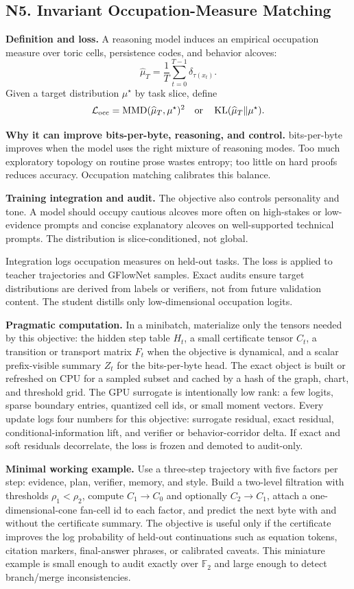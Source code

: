 \documentclass[10pt]{article}
\newcommand{\FF}{\mathbb{F}}
\newcommand{\KL}{\operatorname{KL}}
\newcommand{\loss}{\mathcal{L}}
\numberwithin{equation}{section}
\begin{document}
\subsection{N5. Invariant Occupation-Measure Matching}
\noindent\textbf{Definition and loss.} A reasoning model induces an empirical occupation measure over toric cells, persistence codes, and behavior alcoves:
\[
\widehat\mu_T=\frac1T\sum_{t=0}^{T-1}\delta_{\tau(x_t)}.
\]
Given a target distribution $\mu^\star$ by task slice, define
\[
\loss_{\rm occ}=\mathrm{MMD}(\widehat\mu_T,\mu^\star)^2\quad\text{or}\quad \KL(\widehat\mu_T\|\mu^\star).
\]

\noindent\textbf{Why it can improve bits-per-byte, reasoning, and control.} bits-per-byte improves when the model uses the right mixture of reasoning modes. Too much exploratory topology on routine prose wastes entropy; too little on hard proofs reduces accuracy. Occupation matching calibrates this balance.

\noindent\textbf{Training integration and audit.} The objective also controls personality and tone. A model should occupy cautious alcoves more often on high-stakes or low-evidence prompts and concise explanatory alcoves on well-supported technical prompts. The distribution is slice-conditioned, not global.

Integration logs occupation measures on held-out tasks. The loss is applied to teacher trajectories and GFlowNet samples. Exact audits ensure target distributions are derived from labels or verifiers, not from future validation content. The student distills only low-dimensional occupation logits.

\noindent\textbf{Pragmatic computation.} In a minibatch, materialize only the tensors needed by this objective: the hidden step table $H_t$, a small certificate tensor $C_t$, a transition or transport matrix $F_t$ when the objective is dynamical, and a scalar prefix-visible summary $Z_t$ for the bits-per-byte head. The exact object is built or refreshed on CPU for a sampled subset and cached by a hash of the graph, chart, and threshold grid. The GPU surrogate is intentionally low rank: a few logits, sparse boundary entries, quantized cell ids, or small moment vectors. Every update logs four numbers for this objective: surrogate residual, exact residual, conditional-information lift, and verifier or behavior-corridor delta. If exact and soft residuals decorrelate, the loss is frozen and demoted to audit-only.

\noindent\textbf{Minimal working example.} Use a three-step trajectory with five factors per step: evidence, plan, verifier, memory, and style. Build a two-level filtration with thresholds $\rho_1<\rho_2$, compute $C_1\to C_0$ and optionally $C_2\to C_1$, attach a one-dimensional-cone fan-cell id to each factor, and predict the next byte with and without the certificate summary. The objective is useful only if the certificate improves the log probability of held-out continuations such as equation tokens, citation markers, final-answer phrases, or calibrated caveats. This miniature example is small enough to audit exactly over $\FF_2$ and large enough to detect branch/merge inconsistencies.
\end{document}
